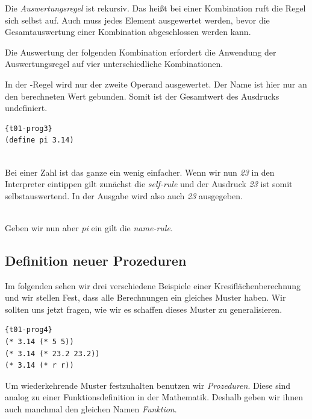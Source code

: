Die \textit{Auswertungsregel} ist rekursiv. Das heißt bei einer Kombination ruft die Regel sich selbst auf. Auch muss jedes Element ausgewertet werden, bevor die Gesamtauswertung einer Kombination abgeschlossen werden kann.

Die Auswertung der folgenden Kombination erfordert die Anwendung der Auswertungsregel auf vier unterschiedliche Kombinationen.


In der -Regel wird nur der zweite Operand ausgewertet. Der Name ist hier nur an den berechneten Wert gebunden. Somit ist der Gesamtwert des Ausdrucks undefiniert.
\begin{lstlisting}{t01-prog3}
(define pi 3.14)
\end{lstlisting}
 \\

Bei einer Zahl ist das ganze ein wenig einfacher. Wenn wir nun \textit{23} in den Interpreter eintippen gilt zunächst die \textit{self-rule} und der Ausdruck \textit{23} ist somit selbstauswertend. In der Ausgabe wird also auch \textit{23} ausgegeben.

\\

Geben wir nun aber \textit{pi} ein gilt die \textit{name-rule}.


\subsection{Definition neuer Prozeduren}
Im folgenden sehen wir drei verschiedene Beispiele einer Kresiflächenberechnung und wir stellen Fest, dass alle Berechnungen ein gleiches Muster haben. Wir sollten uns jetzt fragen, wie wir es schaffen dieses Muster zu generalisieren.
\begin{lstlisting}{t01-prog4}
(* 3.14 (* 5 5))
(* 3.14 (* 23.2 23.2))
(* 3.14 (* r r))
\end{lstlisting}
Um wiederkehrende Muster festzuhalten benutzen wir \textit{Prozeduren}. Diese sind analog zu einer Funktionsdefinition in der Mathematik. Deshalb geben wir ihnen auch manchmal den gleichen Namen \textit{Funktion}.
